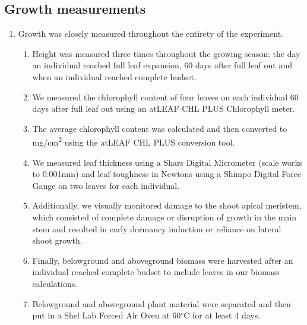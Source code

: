 \documentclass{article}\usepackage[]{graphicx}\usepackage[]{color}
\begin{document}
\subsection*{Growth measurements}
\begin{enumerate}
\item Growth was closely measured throughout the entirety of the experiment. 
  \begin{enumerate}
  \item Height was measured three times throughout the growing season: the day an individual reached full leaf expansion, 60 days after full leaf out and when an individual reached complete budset. 
  \item We measured the chlorophyll content of four leaves on each individual 60 days after full leaf out using an atLEAF CHL PLUS Chlorophyll meter.
  \item The average chlorophyll content was calculated and then converted to mg/cm\textsuperscript{2} using the atLEAF CHL PLUS conversion tool.
  \item We measured leaf thickness using a Shars Digital Micrometer (scale works to 0.001mm) and leaf toughness in Newtons using a Shimpo Digital Force Gauge on two leaves for each individual.
  \item Additionally, we visually monitored damage to the shoot apical meristem, which consisted of complete damage or disruption of growth in the main stem and resulted in early dormancy induction or reliance on lateral shoot growth.
  \item Finally, belowground and aboveground biomass were harvested after an individual reached complete budset to include leaves in our biomass calculations. 
  \item Belowground and aboveground plant material were separated and then put in a Shel Lab Forced Air Oven at 60$^{\circ}$C for at least 4 days. 
  \end{enumerate}
\end{enumerate}
\end{document}
